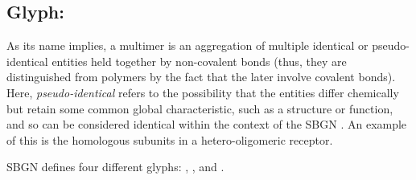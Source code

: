 \subsection{Glyph: }
\label{sec:multimer}

As its name implies, a multimer is an aggregation of multiple identical or pseudo-identical entities held together by non-covalent bonds (thus, they are distinguished from polymers by the fact that the later involve covalent bonds).
Here,  \emph{pseudo-identical} refers to the possibility that the entities differ chemically but retain some common global characteristic, such as a structure or function, and so can be considered identical within the context of the SBGN \PD.
An example of this is the homologous subunits in a hetero-oligomeric receptor.

SBGN \PD defines four different  glyphs: , ,  and .



